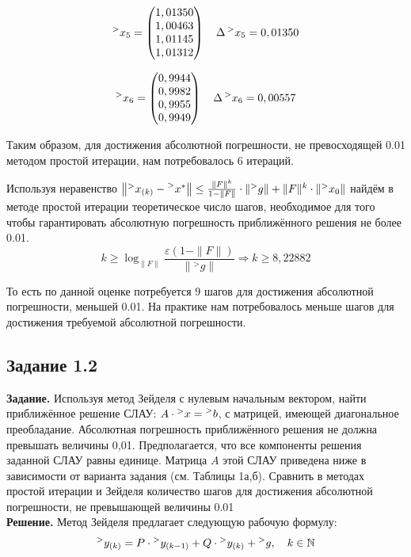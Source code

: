 \documentclass[14pt,a4paper]{scrartcl}
\begin{document}
\begin{equation*}
\prescript{>}{}{x_5} = 
\begin{pmatrix}
1,01350\\
1,00463\\
1,01145\\
1,01312
\end{pmatrix}
\quad
\Delta\prescript{>}{}{x_5} = 0,01350
\end{equation*}

\begin{equation*}
\prescript{>}{}{x_6} = 
\begin{pmatrix}
0,9944\\
0,9982\\
0,9955\\
0,9949
\end{pmatrix}
\quad
\Delta\prescript{>}{}{x_6} = 0,00557
\end{equation*}

Таким образом, для достижения абсолютной погрешности, не превосходящей 0.01 методом простой итерации, нам потребовалось 6 итераций.

Используя неравенство $\left\|\prescript{>}{}{x_{(k)}}-\prescript{>}{}{x^*}\right\| \leq \frac{\|F\|^{k}}{1-\|F\|} \cdot\left\|\prescript{>}{}{g}\right\|+\|F\|^{k} \cdot\left\|\prescript{>}{}{x_0}\right\|$ найдём в методе простой итерации теоретическое число шагов, необходимое для того чтобы гарантировать абсолютную погрешность
приближённого решения не более 0.01.
\begin{equation*}
	k \geq \log _{\|F\|} \frac{\varepsilon(1-\|F\|)}{\left\|^{>} g\right\|} \Rightarrow k \geq 8,22882
\end{equation*}

То есть по данной оценке потребуется 9 шагов для достижения абсолютной погрешности, меньшей 0.01. На практике нам потребовалось меньше шагов для достижения требуемой абсолютной погрешности.

\subsection*{Задание 1.2}
\textbf{Задание.}
Используя метод Зейделя с нулевым начальным вектором, найти приближённое решение СЛАУ: $A \cdot \prescript{>}{}{x} = \prescript{>}{}{b}$, с матрицей, имеющей диагональное преобладание. Абсолютная погрешность
приближённого решения не должна превышать величины 0,01. Предполагается, что все компоненты решения заданной СЛАУ равны единице. Матрица $A$ этой СЛАУ приведена ниже в зависимости от варианта задания (см. Таблицы 1а,б). Сравнить в методах простой итерации и Зейделя количество шагов для достижения абсолютной погрешности, не превышающей  величины 0.01\\
\textbf{Решение.}
Метод Зейделя предлагает следующую рабочую формулу:
\begin{equation*}
	\prescript{>}{}{y_{(k)}} = P \cdot \prescript{>}{}{y_{(k-1)}} + Q \cdot \prescript{>}{}{y_{(k)}} + \prescript{>}{}{g}, \quad k \in \mathbb{N}
\end{equation*}
\end{document}
